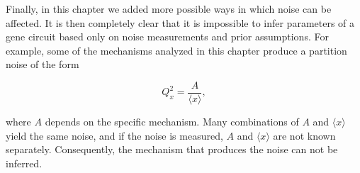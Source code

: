 Finally, in this chapter we added more possible ways in which noise can be affected. It is then completely clear that it is impossible to infer parameters of a gene circuit based only on noise measurements and prior assumptions. For example, some of the mechanisms analyzed in this chapter produce a partition noise of the form

\begin{equation*}
  Q_x^2=\frac{A}{\langle x\rangle},
\end{equation*}

where $A$ depends on the specific mechanism. Many combinations of $A$ and $\langle x\rangle$ yield the same noise, and if the noise is measured, $A$ and $\langle x\rangle$ are not known separately. Consequently, the mechanism that produces the noise can not be inferred. 



